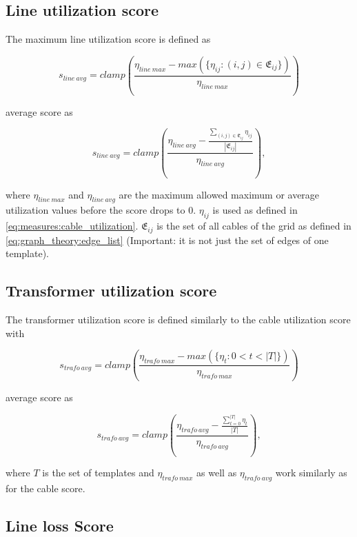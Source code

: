 \subsection{Line utilization score}

The maximum line utilization score is defined as

\begin{equation}
    s_{line \ avg} = clamp(\frac{\eta_{line \ max} - max(\{\eta_{ij} : (i, j) \in \mathfrak{E}_{ij}\})}{\eta_{line \ max}})
\end{equation}

average score as

\begin{equation}
    s_{line \ avg} = clamp(\frac{\eta_{line \ avg} - \frac{\sum_{(i, j) \in \mathfrak{E}_{ij}} \eta_{ij}}{|\mathfrak{E}_{ij}|}}{\eta_{line \ avg}}),
\end{equation}

where $\eta_{line \ max}$ and $\eta_{line \ avg}$ are the maximum allowed maximum or average utilization
values before the score drops to 0. $\eta_{ij}$ is used as defined in \autoref{eq:measures:cable_utilization}.
$\mathfrak{E}_{ij}$ is the set of all cables of the grid as defined in \autoref{eq:graph_theory:edge_list}
(Important: it is not just the set of edges of one template).

\subsection{Transformer utilization score}

The transformer utilization score is defined similarly to the cable utilization score with

\begin{equation}
    s_{trafo \ avg} = clamp(\frac{\eta_{trafo \ max} - max(\{\eta_{t} : 0 < t < |T|\})}{\eta_{trafo \ max}})
\end{equation}

average score as

\begin{equation}
    s_{trafo \ avg} = clamp(\frac{\eta_{trafo \ avg} - \frac{\sum_{t = 0}^{|T|} \eta_t}{|T|}}{\eta_{trafo \ avg}}),
\end{equation}

where $T$ is the set of templates and $\eta_{trafo \ max}$ as well as $\eta_{trafo \ avg}$ work similarly
as for the cable score.

\subsection{Line loss Score}

